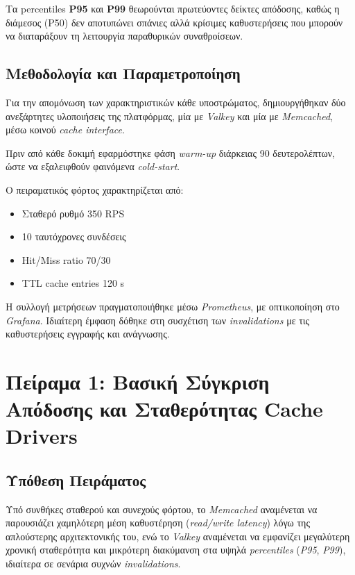 Τα percentiles \textbf{P95} και \textbf{P99} θεωρούνται πρωτεύοντες δείκτες
απόδοσης, καθώς η διάμεσος (P50) δεν αποτυπώνει σπάνιες αλλά κρίσιμες
καθυστερήσεις που μπορούν να διαταράξουν τη λειτουργία παραθυρικών
συναθροίσεων.

\subsection{Μεθοδολογία και Παραμετροποίηση}

Για την απομόνωση των χαρακτηριστικών κάθε υποστρώματος, δημιουργήθηκαν δύο
ανεξάρτητες υλοποιήσεις της πλατφόρμας, μία με \textit{Valkey} και μία με
\textit{Memcached}, μέσω κοινού \textit{cache interface}.

Πριν από κάθε δοκιμή εφαρμόστηκε φάση \textit{warm-up} διάρκειας 90
δευτερολέπτων, ώστε να εξαλειφθούν φαινόμενα \textit{cold-start}.

Ο πειραματικός φόρτος χαρακτηρίζεται από:

\begin{itemize}
	\item Σταθερό ρυθμό 350 RPS
	\item 10 ταυτόχρονες συνδέσεις
	\item Hit/Miss ratio 70/30
	\item TTL cache entries 120 s
\end{itemize}

Η συλλογή μετρήσεων πραγματοποιήθηκε μέσω \textit{Prometheus}, με οπτικοποίηση
στο \textit{Grafana}. Ιδιαίτερη έμφαση δόθηκε στη συσχέτιση των
\textit{invalidations} με τις καθυστερήσεις εγγραφής και ανάγνωσης.

\section{Πείραμα 1: Βασική Σύγκριση Απόδοσης και Σταθερότητας Cache Drivers}

\subsection{Υπόθεση Πειράματος}

Υπό συνθήκες σταθερού και συνεχούς φόρτου, το \textit{Memcached} αναμένεται να
παρουσιάζει χαμηλότερη μέση καθυστέρηση (\textit{read/write latency}) λόγω της
απλούστερης αρχιτεκτονικής του, ενώ το \textit{Valkey} αναμένεται να εμφανίζει
μεγαλύτερη χρονική σταθερότητα και μικρότερη διακύμανση στα υψηλά
\textit{percentiles} (\textit{P95}, \textit{P99}), ιδιαίτερα σε σενάρια συχνών
\textit{invalidations}.

